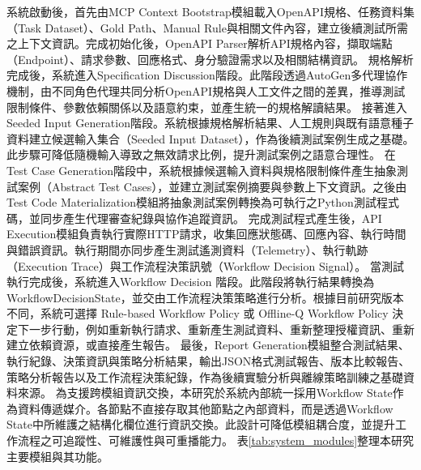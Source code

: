 \begin{ZhChapter}
\text 系統啟動後，首先由MCP Context Bootstrap模組載入OpenAPI規格、任務資料集（Task Dataset）、Gold Path、Manual Rule與相關文件內容，建立後續測試所需之上下文資訊。完成初始化後，OpenAPI Parser解析API規格內容，擷取端點（Endpoint）、請求參數、回應格式、身分驗證需求以及相關結構資訊。
\text 規格解析完成後，系統進入Specification Discussion階段。此階段透過AutoGen多代理協作機制，由不同角色代理共同分析OpenAPI規格與人工文件之間的差異，推導測試限制條件、參數依賴關係以及語意約束，並產生統一的規格解讀結果。
\text 接著進入Seeded Input Generation階段。系統根據規格解析結果、人工規則與既有語意種子資料建立候選輸入集合（Seeded Input Dataset），作為後續測試案例生成之基礎。此步驟可降低隨機輸入導致之無效請求比例，提升測試案例之語意合理性。
\text 在Test Case Generation階段中，系統根據候選輸入資料與規格限制條件產生抽象測試案例（Abstract Test Cases），並建立測試案例摘要與參數上下文資訊。之後由Test Code Materialization模組將抽象測試案例轉換為可執行之Python測試程式碼，並同步產生代理審查紀錄與協作追蹤資訊。
\text 完成測試程式產生後，API Execution模組負責執行實際HTTP請求，收集回應狀態碼、回應內容、執行時間與錯誤資訊。執行期間亦同步產生測試遙測資料（Telemetry）、執行軌跡（Execution Trace）與工作流程決策訊號（Workflow Decision Signal）。
\text 當測試執行完成後，系統進入Workflow Decision 階段。此階段將執行結果轉換為WorkflowDecisionState，並交由工作流程決策策略進行分析。根據目前研究版本不同，系統可選擇 Rule-based Workflow Policy 或 Offline-Q Workflow Policy 決定下一步行動，例如重新執行請求、重新產生測試資料、重新整理授權資訊、重新建立依賴資源，或直接產生報告。
\text 最後，Report Generation模組整合測試結果、執行紀錄、決策資訊與策略分析結果，輸出JSON格式測試報告、版本比較報告、策略分析報告以及工作流程決策紀錄，作為後續實驗分析與離線策略訓練之基礎資料來源。
\text 為支援跨模組資訊交換，本研究於系統內部統一採用Workflow State作為資料傳遞媒介。各節點不直接存取其他節點之內部資料，而是透過Workflow State中所維護之結構化欄位進行資訊交換。此設計可降低模組耦合度，並提升工作流程之可追蹤性、可維護性與可重播能力。
表\ref{tab:system_modules}整理本研究主要模組與其功能。


\end{ZhChapter}
